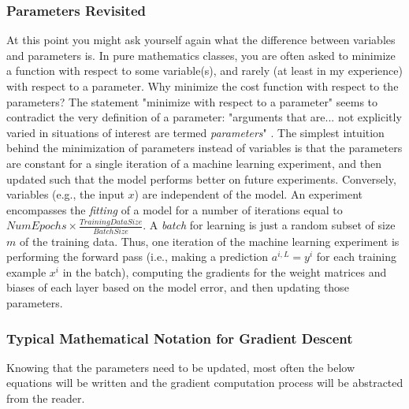 \documentclass{article}
\begin{document}
\subsubsection{Parameters Revisited}

At this point you might ask yourself again what the difference between
variables and parameters is. In pure mathematics classes, you are often asked
to minimize a function with respect to some variable(s), and rarely (at least in
my experience) with respect to a parameter. Why minimize the cost
function with respect to the parameters? The statement "minimize with respect
to a parameter" seems to contradict the very definition of a parameter:
"arguments that are... not explicitly varied in situations of interest are termed
\textit{parameters}" \cite{WolframMathWorldParameterDefinition}. The simplest intuition
behind the minimization of parameters instead of variables
is that the parameters are constant for a single iteration
of a machine learning experiment, and then updated such that the model performs
better on future experiments. Conversely, variables (e.g., the input $x$) are
independent of the model. An experiment encompasses the \textit{fitting} of a
model for a number of iterations equal to
$NumEpochs \times \frac{TrainingDataSize}{BatchSize}$. A \textit{batch} for learning
is just a random subset of size $m$ of the training data. Thus, one iteration of the
machine learning experiment is performing the forward pass (i.e., making a prediction
$a^{i, L} = y^{i}$ for each training example $x^{i}$ in the batch),
computing the gradients for the weight matrices and biases of each layer based on the
model error, and then updating those parameters.

\subsubsection{Typical Mathematical Notation for Gradient Descent}

Knowing that the parameters need to be updated, most often the below equations
will be written and the gradient computation process will be abstracted from
the reader.
\end{document}
